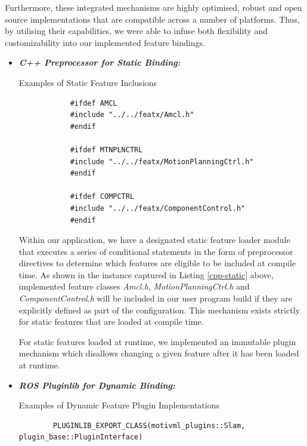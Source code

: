 \documentclass[conference]{IEEEtran}
\begin{document}
Furthermore, these integrated mechanisms are highly optimised, robust and open source implementations that are compatible across a number of platforms. Thus, by utilising their capabilities, we were able to infuse both flexibility and customizability into our implemented feature bindings.\\
\begin{itemize}
	\item \textit{\textbf{C++ Preprocessor for Static Binding:}}
	\begin{listing}[H]
		\caption{Examples of Static Feature Inclusions}
		\begin{verbatim}
			#ifdef AMCL
			#include "../../featx/Amcl.h"
			#endif
			
			#ifdef MTNPLNCTRL
			#include "../../featx/MotionPlanningCtrl.h"
			#endif
			
			#ifdef COMPCTRL
			#include "../../featx/ComponentControl.h"
			#endif
		\end{verbatim}
		\label{cpp-static}
	\end{listing}

Within our application, we have a designated static feature loader module that executes a series of conditional statements in the form of preprocessor directives to determine which features are eligible to be included at compile time. As shown in the instance captured in Listing \ref{cpp-static} above, implemented feature classes \textit{Amcl.h}, \textit{MotionPlanningCtrl.h} and \textit{ComponentControl.h} will be included in our user program build if they are explicitly defined as part of the configuration. This mechanism exists strictly for static features that are loaded at compile time.

For static features loaded at runtime, we implemented an immutable plugin mechanism which disallows changing a given feature after it has been loaded at runtime.\\

\item \textit{\textbf{ROS Pluginlib for Dynamic Binding:}}
	\begin{listing}[H]
		\caption{Examples of Dynamic Feature Plugin Implementations}
		\begin{verbatim}
		PLUGINLIB_EXPORT_CLASS(motivml_plugins::Slam, plugin_base::PluginInterface)
		

\end{verbatim}
\end{listing}
\end{itemize}
\end{document}
